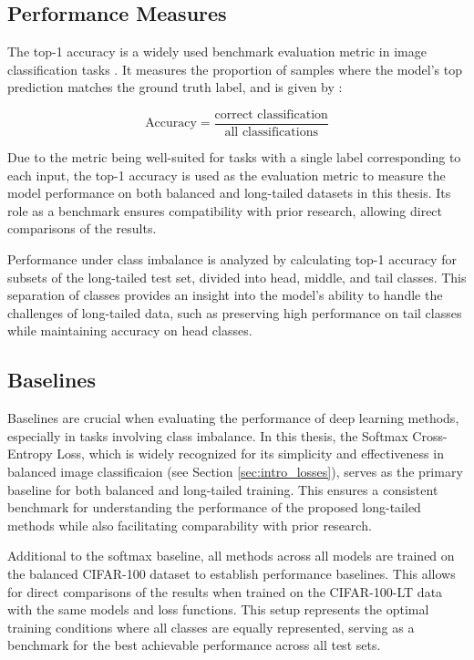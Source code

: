 \subsection{Performance Measures}
The top-1 accuracy is a widely used benchmark evaluation metric in image classification tasks \cite{zhang2023deep}. It measures the proportion of samples where the model's top prediction matches the ground truth label, and is given by \cite{metrics}:

\begin{equation}
    \text{Accuracy} = \frac{\text{correct classification}}{\text{all classifications}}
\end{equation}


Due to the metric being well-suited for tasks with a single label corresponding to each input, the top-1 accuracy is used as the evaluation metric to measure the model performance on both balanced and long-tailed datasets in this thesis. Its role as a benchmark ensures compatibility with prior research, allowing direct comparisons of the results.

Performance under class imbalance is analyzed by calculating top-1 accuracy for subsets of the long-tailed test set, divided into head, middle, and tail classes. This separation of classes provides an insight into the model's ability to handle the challenges of long-tailed data, such as preserving high performance on tail classes while maintaining accuracy on head classes.


\subsection{Baselines}
Baselines are crucial when evaluating the performance of deep learning methods, especially in tasks involving class imbalance. In this thesis, the Softmax Cross-Entropy Loss, which is widely recognized for its simplicity and effectiveness in balanced image classificaion (see Section \ref{sec:intro_losses}), serves as the primary baseline for both balanced and long-tailed training. This ensures a consistent benchmark for understanding the performance of the proposed long-tailed methods while also facilitating comparability with prior research.

Additional to the softmax baseline, all methods across all models are trained on the balanced CIFAR-100 dataset to establish performance baselines. This allows for direct comparisons of the results when trained on the CIFAR-100-LT data with the same models and loss functions. This setup represents the optimal training conditions where all classes are equally represented, serving as a benchmark for the best achievable performance across all test sets.


